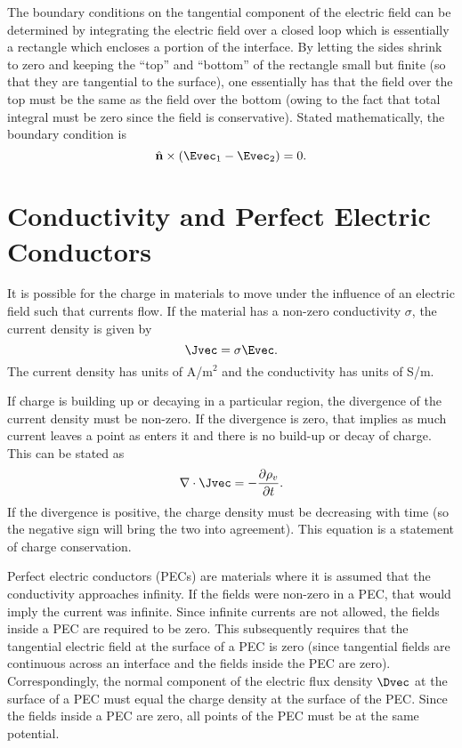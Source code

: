 The boundary conditions on the tangential component of the electric
field can be determined by integrating the electric field over a
closed loop which is essentially a rectangle which encloses a portion
of the interface.  By letting the sides shrink to zero and keeping the
``top'' and ``bottom'' of the rectangle small but finite (so that they
are tangential to the surface), one essentially has that the field
over the top must be the same as the field over the bottom (owing to
the fact that total integral must be zero since the field is
conservative).  Stated mathematically, the boundary condition is
\begin{equation}
 \hat{\mathbf{n}} \times (\Evec_1 - \Evec_2) = 0.
\end{equation}

\section{Conductivity and Perfect Electric Conductors}

It is possible for the charge in materials to move under the influence
of an electric field such that currents flow.  If the material has a
non-zero conductivity $\sigma$, the current density is given by
\begin{equation}
  \Jvec = \sigma \Evec.
\end{equation}
The current density has units of A/m$^2$ and the conductivity has
units of S/m.

If charge is building up or decaying in a particular region, the
divergence of the current density must be non-zero.  If the divergence
is zero, that implies as much current leaves a point as enters it and
there is no build-up or decay of charge.  This can be stated as
\begin{equation}
  \nabla \cdot \Jvec = -\frac{\partial \rho_v}{\partial t}.
  \label{eq:chargeConservation}
\end{equation}
If the divergence is positive, the charge density must be decreasing
with time (so the negative sign will bring the two into agreement).
This equation is a statement of charge conservation.

Perfect electric conductors (PECs) are materials where it is assumed
that the conductivity approaches infinity.  If the fields were
non-zero in a PEC, that would imply the current was infinite.  Since
infinite currents are not allowed, the fields inside a PEC are
required to be zero.  This subsequently requires that the tangential
electric field at the surface of a PEC is zero (since tangential
fields are continuous across an interface and the fields inside the
PEC are zero).  Correspondingly, the normal component of the electric
flux density $\Dvec$ at the surface of a PEC must equal the charge
density at the surface of the PEC.  Since the fields inside a PEC are
zero, all points of the PEC must be at the same potential.


